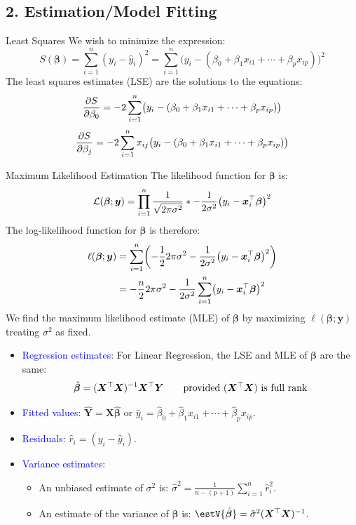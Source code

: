 \documentclass[oneside]{book}\usepackage[]{graphicx}\usepackage[svgnames]{xcolor}
\let\exp\relax%
\let\log\relax%
\providecommand{\RandomVector}[1]{\bm{#1}}%
\providecommand{\Vector}[1]{\bm{#1}}%
\providecommand{\Matrix}[1]{\bm{#1}}
\begin{document}
\subsection*{2. Estimation/Model Fitting}
\begin{Regular}{Least Squares}
      We wish to minimize the expression:
      \[ S(\Vector{\beta})=\sum_{i=1}^{n} (y_i-\hat{y}_i)^2=\sum_{i=1}^{n} \bigl(y_i-(\beta_0+\beta_1x_{i1}+\cdots+\beta_p x_{ip})\bigr)^2 \]
      The least squares estimates (LSE) are the solutions to the equations:
      \[ \pdv{S}{\beta_0}=-2 \sum_{i=1}^{n}\bigl(y_i-(\beta_0+\beta_1x_{i1}+\cdots+\beta_p x_{ip})\bigr) \]
      \[ \pdv{S}{\beta_j}=-2 \sum_{i=1}^{n}x_{ij}\bigl(y_i-(\beta_0+\beta_1x_{i1}+\cdots+\beta_p x_{ip})\bigr) \]
\end{Regular}
\begin{Regular}{Maximum Likelihood Estimation}
      The likelihood function for $ \Vector{\beta} $ is:
      \[ \mathcal{L}(\Vector{\beta};\Vector{y})=\prod_{i=1}^n \frac{1}{\sqrt{2\pi\sigma^2}} \exp*{-\frac{1}{2\sigma^2} \bigl(y_i-\Vector{x}_i^\top \Vector{\beta}\bigr)^2} \]
      The log-likelihood function for $ \Vector{\beta} $ is therefore:
      \begin{align*}
            \ell(\Vector{\beta};\Vector{y})
             & =\sum_{i=1}^{n} \biggl(-\frac{1}{2} \log{2\pi\sigma^2}-\frac{1}{2\sigma^2} \bigl(y_i-\Vector{x}_i^\top \Vector{\beta}\bigr)^2\biggr) \\
             & =-\frac{n}{2} \log{2\pi\sigma^2}-\frac{1}{2\sigma^2} \sum_{i=1}^{n} \bigl(y_i-\Vector{x}_i^\top \Vector{\beta}\bigr)^2
      \end{align*}
      We find the maximum likelihood estimate (MLE) of $ \Vector{\beta} $ by maximizing $ \ell(\Vector{\beta};\Vector{y}) $ treating $ \sigma^2 $ as fixed.
\end{Regular}
\begin{itemize}
      \item \textcolor{Blue}{Regression estimates}: For Linear Regression, the LSE and MLE of $ \Vector{\beta} $ are the same:
            \[ \hat{\RandomVector{\beta}}=(\Matrix{X}^\top \Matrix{X})^{-1}\Matrix{X}^\top \RandomVector{Y}\qquad\text{provided $ (\Matrix{X}^\top \Matrix{X}) $ is full rank} \]
      \item \textcolor{Blue}{Fitted values}: $ \hat{\RandomVector{Y}}=\Matrix{X}\hat{\RandomVector{\beta}} $ or $ \hat{y}_i=\hat{\beta}_0+\hat{\beta}_1x_{i1}+\cdots+\hat{\beta}_p x_{ip} $.
      \item \textcolor{Blue}{Residuals}: $ \hat{r}_i=(y_i-\hat{y}_i) $.
      \item \textcolor{Blue}{Variance estimates}:
            \begin{itemize}
                  \item An unbiased estimate of $ \sigma^2 $ is: $ \displaystyle \hat{\sigma}^2=\frac{1}{n-(p+1)} \sum_{i=1}^{n} \hat{r}_i^2 $.
                  \item An estimate of the variance of $ \hat{\RandomVector{\beta}} $ is:
                        $ \estV{\hat{\RandomVector{\beta}}}=\hat{\sigma}^2(\Matrix{X}^\top \Matrix{X})^{-1} $.
            \end{itemize}
\end{itemize}
\end{document}
